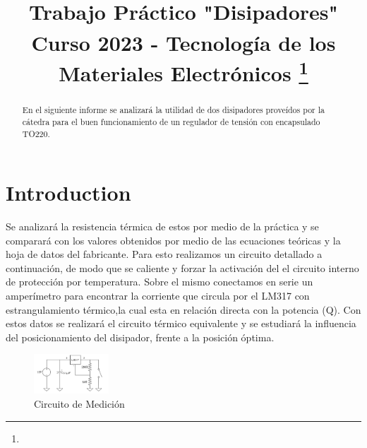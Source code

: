 \documentclass[conference]{IEEEtran}
\begin{document}
\title{Trabajo Práctico "Disipadores"\\
{\footnotesize \textsuperscript{}Curso 2023 - Tecnología de los Materiales Electrónicos}
\thanks{}
}

\author{
\and
{}
}

\maketitle


\begin{abstract}
En el siguiente informe se analizará la utilidad de dos disipadores proveídos por la cátedra
para el buen funcionamiento de un regulador de tensión con encapsulado TO220.
\end{abstract}

\section{Introduction}
Se analizará la resistencia térmica de estos por medio de la práctica y se comparará con los valores 
obtenidos por medio de las ecuaciones teóricas y la hoja de datos del fabricante. Para esto realizamos un
circuito detallado a continuación, de modo que se caliente y forzar la activación del el circuito interno de
protección por temperatura. Sobre el mismo conectamos en serie un amperímetro para encontrar la corriente
que circula por el LM317 con estrangulamiento térmico,la cual esta en relación directa con la potencia (Q).
Con estos datos se realizará el circuito térmico equivalente y se estudiará la influencia del posicionamiento
del disipador, frente a la posición óptima.
\begin{figure}[h]
    \centering
    \includegraphics[width=0.25\textwidth]{CircuitoDeMedicion.png}
    \caption{Circuito de Medición}
\end{figure}
\end{document}

